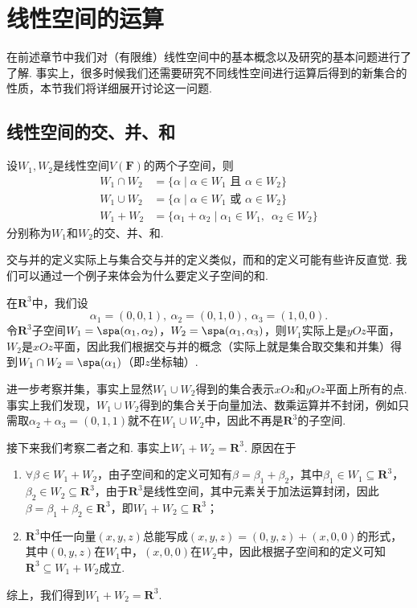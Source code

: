 \chapter{线性空间的运算}

在前述章节中我们对（有限维）线性空间中的基本概念以及研究的基本问题进行了了解. 事实上，很多时候我们还需要研究不同线性空间进行运算后得到的新集合的性质，本节我们将详细展开讨论这一问题.

\section{线性空间的交、并、和}

\begin{definition}
    设$W_1,W_2$是线性空间$V(\mathbf{F})$的两个子空间，则
    \begin{align*}
        W_1 \cap W_2 & =\{\alpha \mid \alpha\in W_1 \text{~且~} \alpha\in W_2\}            \\
        W_1 \cup W_2 & =\{\alpha \mid \alpha\in W_1 \text{~或~} \alpha\in W_2\}            \\
        W_1 + W_2    & =\{\alpha_1+\alpha_2 \mid \alpha_1\in W_1,\enspace\alpha_2\in W_2\}
    \end{align*}
    分别称为$W_1$和$W_2$的交、并、和.
\end{definition}

交与并的定义实际上与集合交与并的定义类似，而和的定义可能有些许反直觉. 我们可以通过一个例子来体会为什么要定义子空间的和.
\begin{example}\label{ex:4:子空间运算}
    在$\mathbf{R}^3$中，我们设
    \[\alpha_1=(0,0,1),\ \alpha_2=(0,1,0),\ \alpha_3=(1,0,0).\]
    令$\mathbf{R}^3$子空间$W_1=\spa(\alpha_1,\alpha_2)$，$W_2=\spa(\alpha_1,\alpha_3)$，则$W_1$实际上是$yOz$平面，$W_2$是$xOz$平面，因此我们根据交与并的概念（实际上就是集合取交集和并集）得到$W_1 \cap W_2=\spa(\alpha_1)$（即$z$坐标轴）.

    进一步考察并集，事实上显然$W_1 \cup W_2$得到的集合表示$xOz$和$yOz$平面上所有的点. 事实上我们发现，$W_1 \cup W_2$得到的集合关于向量加法、数乘运算并不封闭，例如只需取$\alpha_2+\alpha_3=(0,1,1)$就不在$W_1 \cup W_2$中，因此不再是$\mathbf{R}^3$的子空间.

    接下来我们考察二者之和. 事实上$W_1+W_2=\mathbf{R}^3$. 原因在于
    \begin{enumerate}
        \item $\forall \beta\in W_1 + W_2$，由子空间和的定义可知有$\beta=\beta_1+\beta_2$，其中$\beta_1\in W_1\subseteq \mathbf{R}^3$，$\beta_2\in W_2\subseteq \mathbf{R}^3$，由于$\mathbf{R}^3$是线性空间，其中元素关于加法运算封闭，因此$\beta=\beta_1+\beta_2\in \mathbf{R}^3$，即$W_1+W_2\subseteq \mathbf{R}^3$；

        \item $\mathbf{R}^3$中任一向量$(x,y,z)$总能写成$(x,y,z)=(0,y,z)+(x,0,0)$的形式，其中$(0,y,z)$在$W_1$中，$(x,0,0)$在$W_2$中，因此根据子空间和的定义可知$\mathbf{R}^3\subseteq W_1 + W_2$成立.
    \end{enumerate}
    综上，我们得到$W_1+W_2=\mathbf{R}^3$.
\end{example}

